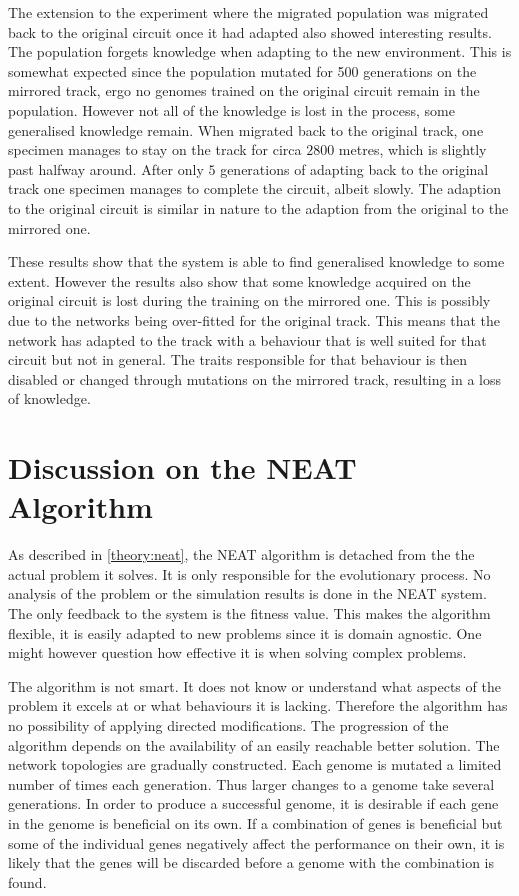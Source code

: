The extension to the experiment where the migrated population was migrated back to the original circuit once it had adapted also showed interesting results. The population forgets knowledge when adapting to the new environment. This is somewhat expected since the population mutated for 500 generations on the mirrored track, ergo no genomes trained on the original circuit remain in the population. However not all of the knowledge is lost in the process, some generalised knowledge remain. When migrated back to the original track, one specimen manages to stay on the track for circa $2800$ metres, which is slightly past halfway around. After only $5$ generations of adapting back to the original track one specimen manages to complete the circuit, albeit slowly. The adaption to the original circuit is similar in nature to the adaption from the original to the mirrored one. 

These results show that the system is able to find generalised knowledge to some extent. However the results also show that some knowledge acquired on the original circuit is lost during the training on the mirrored one. This is possibly due to the networks being over-fitted for the original track. This means that the network has adapted to the track with a behaviour that is well suited for that circuit but not in general. The traits responsible for that behaviour is then disabled or changed through mutations on the mirrored track, resulting in a loss of knowledge.

\section{Discussion on the NEAT Algorithm}
\label{discussion:neat_mechanism}
As described in \ref{theory:neat}, the NEAT algorithm is detached from the the actual problem it solves. It is only responsible for the evolutionary process. No analysis of the problem or the simulation results is done in the NEAT system. The only feedback to the system is the fitness value. This makes the algorithm flexible, it is easily adapted to new problems since it is domain agnostic. One might however question how effective it is when solving complex problems.  

The algorithm is not smart. It does not know or understand what aspects of the problem it excels at or what behaviours it is lacking. Therefore the algorithm has no possibility of applying directed modifications. The progression of the algorithm depends on the availability of an easily reachable better solution. The network topologies are gradually constructed. Each genome is mutated a limited number of times each generation. Thus larger changes to a genome take several generations. In order to produce a successful genome, it is desirable if each gene in the genome is beneficial on its own. If a combination of genes is beneficial but some of the individual genes negatively affect the performance on their own, it is likely that the genes will be discarded before a genome with the combination is found.

